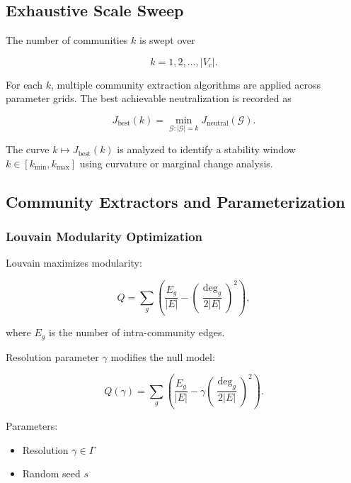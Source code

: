 \documentclass[conference]{IEEEtran}
\begin{document}
\subsection{Exhaustive Scale Sweep}

The number of communities $k$ is swept over

\begin{equation}
k = 1, 2, \dots, |V_c|.
\label{eq:k_range}
\end{equation}

For each $k$, multiple community extraction algorithms are applied across parameter grids. 
The best achievable neutralization is recorded as

\begin{equation}
J_{\text{best}}(k) = 
\min_{\mathcal{G}: |\mathcal{G}|=k}
J_{\text{neutral}}(\mathcal{G}).
\label{eq:J_best}
\end{equation}

The curve $k \mapsto J_{\text{best}}(k)$ is analyzed to identify a stability window 
$k \in [k_{\min}, k_{\max}]$ using curvature or marginal change analysis.

\subsection{Community Extractors and Parameterization}

\subsubsection{Louvain Modularity Optimization}

Louvain maximizes modularity:

\begin{equation}
Q =
\sum_{g}
\left(
\frac{E_g}{|E|}
-
\left( \frac{\deg_g}{2|E|} \right)^2
\right),
\label{eq:modularity}
\end{equation}

where $E_g$ is the number of intra-community edges.

Resolution parameter $\gamma$ modifies the null model:

\begin{equation}
Q(\gamma) =
\sum_{g}
\left(
\frac{E_g}{|E|}
-
\gamma
\left( \frac{\deg_g}{2|E|} \right)^2
\right).
\label{eq:louvain_gamma}
\end{equation}

Parameters:
\begin{itemize}
\item Resolution $\gamma \in \Gamma$
\item Random seed $s$
\end{itemize}
\end{document}
